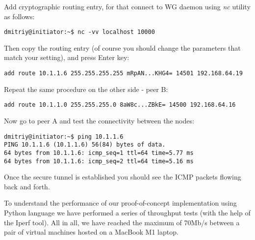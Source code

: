 Add cryptographic routing entry, for that connect to WG daemon using {\it   nc} utility as follows:

\begin{small}
\begin{verbatim}
dmitriy@initiator:~$ nc -vv localhost 10000
\end{verbatim}
\end{small}

Then copy the routing entry (of course you should change the parameters that match your setting),
and press Enter key:

\begin{small}
\begin{verbatim}
add route 10.1.1.6 255.255.255.255 mRpAN...KHG4= 14501 192.168.64.19
\end{verbatim}
\end{small}

Repeat the same procedure on the other side - peer B:

\begin{small}
\begin{verbatim}
add route 10.1.1.0 255.255.255.0 8aW8c...ZBkE= 14500 192.168.64.16
\end{verbatim}
\end{small}

Now go to peer A and test the connectivity between the nodes:
\begin{verbatim}
dmitriy@initiator:~$ ping 10.1.1.6
PING 10.1.1.6 (10.1.1.6) 56(84) bytes of data.
64 bytes from 10.1.1.6: icmp_seq=1 ttl=64 time=5.77 ms
64 bytes from 10.1.1.6: icmp_seq=2 ttl=64 time=5.16 ms
\end{verbatim}

Once the secure tunnel is established you should see the ICMP packets flowing back and forth.

To understand the performance of our proof-of-concept implementation using Python language we 
have performed a series of throughput tests (with the help of the Iperf tool). All in all, 
we have reached the maximum of 70Mb/s between a pair of virtual machines hosted on a MacBook 
M1 laptop.

